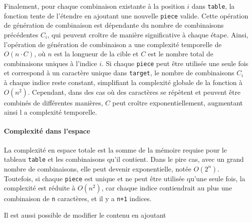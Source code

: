 \documentclass[9pt]{report}
\begin{document}
\begin{multicols*}{2}
  Finalement, pour chaque combinaison existante à la position $i$ dans \texttt{table}, 
  la fonction tente de l'étendre en ajoutant une nouvelle \texttt{piece} valide. 
  Cette opération de génération de combinaison est dépendante du nombre de
  combinaisons précédentes $C_i$, qui peuvent croître de manière significative 
  à chaque étape. Ainsi, l'opération de génération de combinaison a une 
  complexité temporelle de $O(n \cdot C)$, où $n$ est la longueur de la 
  cible et $C$ est le nombre total de combinaisons uniques à l'indice $i$. 
  Si chaque \texttt{piece} peut être utilisée une seule fois et correspond 
  à un caractère unique dans \texttt{target}, le nombre de combinaisons $C_i$ 
  à chaque indice reste constant, simplifiant la complexité globale de la fonction à $O(n^2)$.
  Cependant, dans des cas où des caractères se répètent et peuvent être combinés de
  différentes manières, $C$ peut croître exponentiellement, augmentant ainsi l
  a complexité temporelle.


  \paragraph{Complexité dans l'espace}
  La complexité en espace totale est la somme de la mémoire requise pour le tableau 
  \texttt{table} et les combinaisons qu'il contient. Dans le pire cas, avec un grand nombre de 
  combinaisons, elle peut devenir exponentielle, notée \( O(2^n) \). Toutefois, si chaque 
  \texttt{piece} est unique et ne peut être utilisée qu'une seule fois, la complexité est 
  réduite à \( O(n^2) \), car chaque indice contiendrait au plus une combinaison de \texttt{n} 
  caractères, et il y a \texttt{n+1} indices.


  Il est aussi possible de modifier
  le contenu 
  en ajoutant















\end{multicols*}
\end{document}
